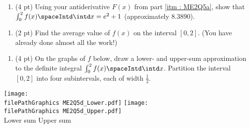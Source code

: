 \begin{enumerate}[resume,label=(\alph*)]
\item\label{itm : ME2Q5b} (4 pt) Using your antiderivative $F(x)$ from part \ref{itm : ME2Q5a}, show that $\int_{0}^{2} f(x) \spaceIntd \intd x = e^{2} + 1$ (approximately $8.3890$).
\end{enumerate}




\begin{enumerate}[resume,label=(\alph*)]
\item\label{itm : ME2Q5c} (2 pt) Find the average value of $f(x)$ on the interval $[0,2]$. (You have already done almost all the work!)
\end{enumerate}




\begin{enumerate}[resume,label=(\alph*)]
\item\label{itm : ME2Q5d} (4 pt) On the graphs of $f$ below, draw a lower- and upper-sum approximation to the definite integral $\int_{0}^{2} f(x) \spaceIntd \intd x$. Partition the interval $[0,2]$ into four subintervals, each of width $\frac{1}{2}$.
\end{enumerate}
\begin{center}
\texttt{[image: \\filePathGraphics ME2Q5d\_Lower.pdf]}%
\hspace{0.5in}
\texttt{[image: \\filePathGraphics ME2Q5d\_Upper.pdf]}%
\\
Lower sum
\hspace{2.25in}
Upper sum
\end{center}



